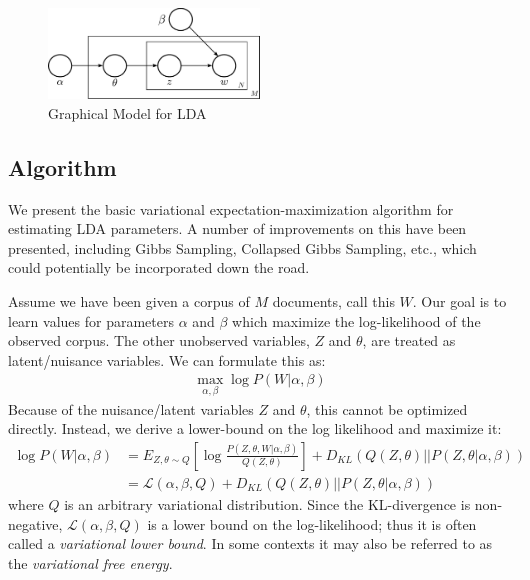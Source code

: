 \documentclass[10pt]{article}
\begin{document}
\begin{figure}[h!]
\begin{centering}
    \includegraphics[width=0.5\textwidth]{./lda_plate.pdf}
\par\end{centering}
\caption{Graphical Model for LDA\label{fig:lda-graphical}}
\end{figure}

\subsection{Algorithm}
We present the basic variational expectation-maximization algorithm for estimating LDA parameters. A number of improvements on this have been presented, including Gibbs Sampling, Collapsed Gibbs Sampling, etc., which could potentially be incorporated down the road.

Assume we have been given a corpus of $M$ documents, call this $W$. Our goal is to learn values for parameters $\alpha$ and $\beta$ which maximize the log-likelihood of the observed corpus. The other unobserved variables, $Z$ and $\theta$, are treated as latent/nuisance variables. We can formulate this as:
\begin{align}
    \max_{\alpha, \beta} \log P(W | \alpha, \beta)
\end{align}
Because of the nuisance/latent variables $Z$ and $\theta$, this cannot be optimized directly. Instead, we derive a lower-bound on the log likelihood and maximize it:
\begin{align}
    \log P(W | \alpha, \beta)
    &= E_{Z, \theta \sim Q}\left[\log \frac{P(Z, \theta, W | \alpha, \beta)}{Q(Z, \theta)}\right] + D_{KL}(Q(Z, \theta) || P(Z, \theta | \alpha, \beta))\\
    &= \mathcal{L}(\alpha, \beta, Q) + D_{KL}(Q(Z, \theta) || P(Z, \theta | \alpha, \beta))
\end{align}
where $Q$ is an arbitrary variational distribution. Since the KL-divergence is non-negative, $\mathcal{L}(\alpha, \beta, Q)$ is a lower bound on the log-likelihood; thus it is often called a \textit{variational lower bound}. In some contexts it may also be referred to as the \textit{variational free energy}.
\end{document}
